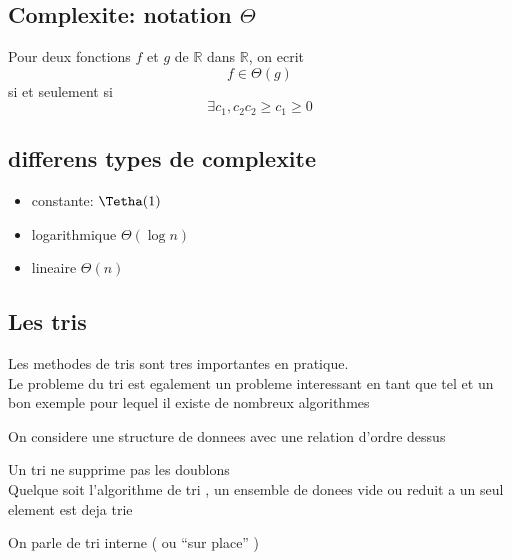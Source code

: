 \documentclass[../main.tex]{subfiles}
\begin{document}
\subsection{Complexite: notation $\Theta$}
\begin{defn}
Pour deux fonctions $f$ et $g$ de $\mathbb{R}$ dans $\mathbb{R}$, on ecrit
\[ 
	f \in \Theta(g)
\]
si et seulement si 
\[ 
\exists c_1, c_2  c_2\geq c_1\geq 0
\]

\end{defn}

\subsection{ differens types de complexite }

\begin{itemize}
	\item constante: $\Tetha(1)$ 
	\item logarithmique $\Theta(\log n)$ 
	\item lineaire $\Theta(n)$
\end{itemize}

\subsection{Les tris}
Les methodes de tris sont tres importantes en pratique.\\
Le probleme du tri est egalement un probleme interessant en tant que tel et un bon exemple pour lequel il existe de nombreux algorithmes

On considere une structure de donnees avec une relation d'ordre dessus
\begin{rmq}
Un tri ne supprime pas les doublons\\
Quelque soit l'algorithme de tri , un ensemble de donees vide ou reduit a un seul element est deja trie
\end{rmq}
On parle de tri interne ( ou ``sur place'' )
\end{document}

